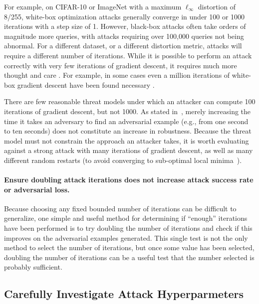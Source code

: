 \documentclass{article} %
\begin{document}
For example, on
CIFAR-10 or ImageNet with a maximum $\ell_\infty$ distortion of 8/255,
white-box optimization attacks generally converge in under 100 or 1000
iterations with a step size of 1.
%
However, black-box attacks often take orders of magnitude more queries,
with attacks requiring over 100,000 queries not being abnormal.
%
For a different dataset, or a different
distortion metric, attacks will require a different number of iterations.
%
While it is
possible to perform an attack correctly with very few iterations
of gradient descent, it requires much more thought and care \citep{engstrom2018evaluating}.
%
For example, in some cases even a million iterations of white-box gradient descent
have been found necessary \citep{qian2018l2}.

There are few reasonable threat models under which an attacker can
compute 100 iterations of gradient descent, but not 1000. As stated in~\cite{athalye2018obfuscated}, merely increasing the time it takes an adversary to find an adversarial example (e.g., from one second to ten seconds) does not constitute an increase in robustness.
%
Because the threat model must not constrain the approach an
attacker takes, it is worth evaluating against a strong attack
with many iterations of gradient descent, as well as many different random restarts (to avoid converging to sub-optimal local minima~\citep{madry2017towards,mosbach2018logit}).

\paragraph{Ensure doubling attack iterations does not increase attack success rate or adversarial loss.}
%
Because choosing any fixed bounded number of iterations can be difficult to
generalize, one simple and useful method for determining if ``enough'' iterations
have been performed is to try doubling the number of iterations and check if this
improves on the adversarial examples generated.
%
This single test is not the only method to select the number of iterations,
but once some value has been selected, doubling the number of iterations
can be a useful test that the number selected is probably sufficient.



\subsection{Carefully Investigate Attack Hyperparmeters}
\label{sec:hyperparams}
\end{document}
